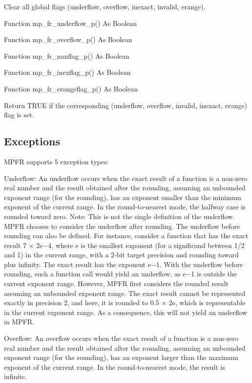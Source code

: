 Clear all global flags (underflow, overflow, inexact, invalid, erange). 

\vspace{0.3cm}
Function mp\_fr\_underflow\_p() As Boolean 

Function mp\_fr\_overflow\_p() As Boolean 

Function mp\_fr\_nanflag\_p() As Boolean 

Function mp\_fr\_inexflag\_p() As Boolean 

Function mp\_fr\_erangeflag\_p() As Boolean 

Return TRUE if the corresponding (underflow, overflow, invalid, inexact, erange) flag is set. 



\subsection{Exceptions}
MPFR supports 5 exception types: 

\vspace{0.3cm}
Underflow: An underflow occurs when the exact result of a function is a non-zero real number and the result obtained after the rounding, assuming an unbounded exponent range (for the rounding), has an exponent smaller than the minimum exponent of the current range. In the round-to-nearest mode, the halfway case is rounded toward zero. Note: This is not the single definition of the underflow. MPFR chooses to consider the underflow after rounding. The underflow before rounding can also be defined. For instance, consider a function that has the exact result 7 × 2e−4, where e is the smallest exponent (for a significand between 1/2 and 1) in the current range, with a 2-bit target precision and rounding toward plus infinity. The exact result has the exponent e−1. With the underflow before rounding, such a function call would yield an underflow, as e−1 is outside the current exponent range. However, MPFR first considers the rounded result assuming an unbounded exponent range. The exact result cannot be represented exactly in precision 2, and here, it is rounded to 0.5 × 2e, which is representable in the current exponent range. As a consequence, this will not yield an underflow in MPFR. 

\vspace{0.3cm}
Overflow: An overflow occurs when the exact result of a function is a non-zero real number and the result obtained after the rounding, assuming an unbounded exponent range (for the rounding), has an exponent larger than the maximum exponent of the current range. In the round-to-nearest mode, the result is infinite. 


